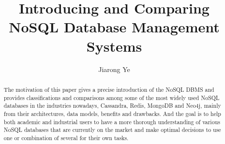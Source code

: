 \documentclass[sigconf]{acmart}
\begin{document}
\title{Introducing and Comparing NoSQL Database Management Systems}


\author{Jiarong Ye}




\begin{abstract}
	 The motivation of this paper gives a precise introduction of the
	NoSQL DBMS and provides classifications and comparisons among some of the most widely used NoSQL databases
	in the industries nowadays, Cassandra, Redis, MongoDB and Neo4j, mainly from their architectures, data models, benefits and drawbacks. And the goal is to help both academic and industrial users to have a more thorough understanding of various NoSQL databases that are currently on the market and make optimal decisions to use one or combination of several for their own tasks.
	
\end{abstract}


%






\maketitle





\end{document}
